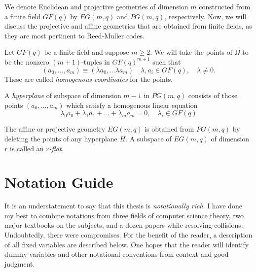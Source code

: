 \documentclass[12pt,twoside]{reedthesis}
\theoremstyle{definition}
\begin{document}
We denote Euclidean and projective geometries of dimension $m$ constructed from a finite field $GF(q)$ by $EG(m,q)$ and $PG(m,q)$, respectively. Now, we will discuss the projective and affine geometries that are obtained from finite fields, as they are most pertinent to Reed-Muller codes.

Let $GF(q)$ be a finite field and suppose $m \geq 2$. We will take the points of $\Omega$ to be the nonzero $(m+1)$-tuples in $GF(q)^{m+1}$ such that
\begin{equation*}
(a_0, \ldots, a_m) \equiv (\lambda a_0, \ldots \lambda a_m) \quad \lambda, a_i \in GF(q), \quad \lambda \neq 0.
\end{equation*}
These are called \textit{homogenous coordinates} for the points. 

A \textit{hyperplane} of subspace of dimension $m-1$ in $PG(m,q)$ consists of those points $(a_0, \ldots , a_m)$ which satisfy a homogenous linear equation 
\begin{equation*}
\lambda_0 a_0 + \lambda_1 a_1 + \ldots + \lambda_m a_m = 0, \quad \lambda_i \in GF(q)
\end{equation*}

The affine or projective geometry $EG(m,q)$ is obtained from $PG(m,q)$ by deleting the points of any hyperplane $H$. A subspace of $EG(m,q)$ of dimension $r$ is called an \textit{$r$-flat}. 

\chapter{Notation Guide}
It is an understatement to say that this thesis is \emph{notationally rich}. I have done my best to combine notations from three fields of computer science theory, two major textbooks on the subjects, and a dozen papers while resolving collisions. Undoubtedly, there were compromises. For the benefit of the reader, a description of all fixed variables are described below. One hopes that the reader will identify dummy variables and other notational conventions from context and good judgment. 
\end{document}
